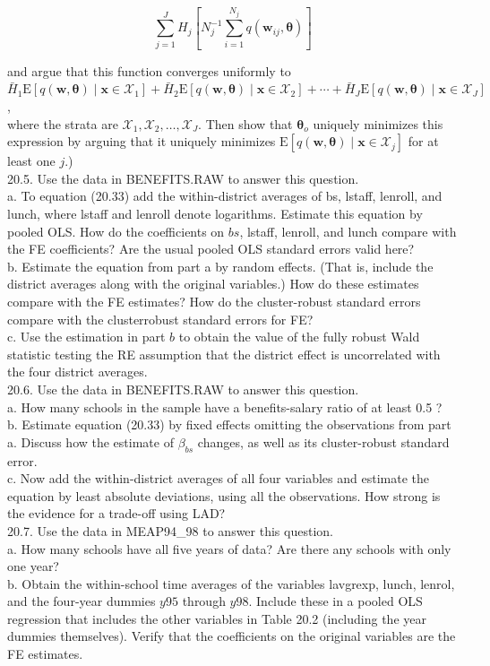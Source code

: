 \documentclass[10pt]{article}
\begin{document}
$$
\sum_{j=1}^{J} H_{j}\left[N_{j}^{-1} \sum_{i=1}^{N_{j}} q\left(\mathbf{w}_{i j}, \boldsymbol{\theta}\right)\right]
$$

and argue that this function converges uniformly to\\
$\bar{H}_{1} \mathrm{E}\left[q(\mathbf{w}, \boldsymbol{\theta}) \mid \mathbf{x} \in \mathscr{X}_{1}\right]+\bar{H}_{2} \mathrm{E}\left[q(\mathbf{w}, \boldsymbol{\theta}) \mid \mathbf{x} \in \mathscr{X}_{2}\right]+\cdots+\bar{H}_{J} \mathrm{E}\left[q(\mathbf{w}, \boldsymbol{\theta}) \mid \mathbf{x} \in \mathscr{X}_{J}\right]$,\\
where the strata are $\mathscr{X}_{1}, \mathscr{X}_{2}, \ldots, \mathscr{X}_{J}$. Then show that $\boldsymbol{\theta}_{o}$ uniquely minimizes this expression by arguing that it uniquely minimizes $\mathrm{E}\left[q(\mathbf{w}, \boldsymbol{\theta}) \mid \mathbf{x} \in \mathscr{X}_{j}\right]$ for at least one $j$.)\\
20.5. Use the data in BENEFITS.RAW to answer this question.\\
a. To equation (20.33) add the within-district averages of bs, lstaff, lenroll, and lunch, where lstaff and lenroll denote logarithms. Estimate this equation by pooled OLS. How do the coefficients on $b s$, lstaff, lenroll, and lunch compare with the FE coefficients? Are the usual pooled OLS standard errors valid here?\\
b. Estimate the equation from part a by random effects. (That is, include the district averages along with the original variables.) How do these estimates compare with the FE estimates? How do the cluster-robust standard errors compare with the clusterrobust standard errors for FE?\\
c. Use the estimation in part $b$ to obtain the value of the fully robust Wald statistic testing the RE assumption that the district effect is uncorrelated with the four district averages.\\
20.6. Use the data in BENEFITS.RAW to answer this question.\\
a. How many schools in the sample have a benefits-salary ratio of at least 0.5 ?\\
b. Estimate equation (20.33) by fixed effects omitting the observations from part a. Discuss how the estimate of $\beta_{b s}$ changes, as well as its cluster-robust standard error.\\
c. Now add the within-district averages of all four variables and estimate the equation by least absolute deviations, using all the observations. How strong is the evidence for a trade-off using LAD?\\
20.7. Use the data in MEAP94\_98 to answer this question.\\
a. How many schools have all five years of data? Are there any schools with only one year?\\
b. Obtain the within-school time averages of the variables lavgrexp, lunch, lenrol, and the four-year dummies $y 95$ through $y 98$. Include these in a pooled OLS regression that includes the other variables in Table 20.2 (including the year dummies themselves). Verify that the coefficients on the original variables are the FE estimates.
\end{document}
